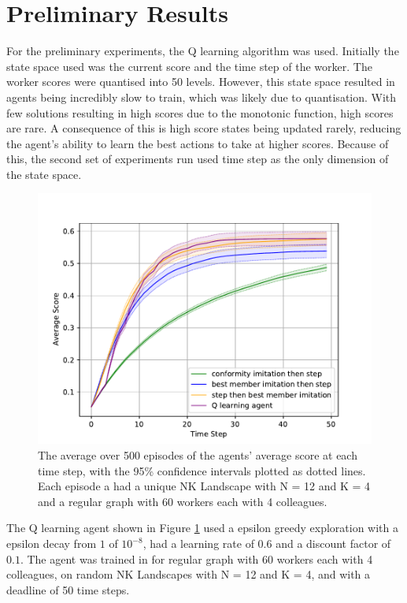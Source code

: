 \documentclass[conference]{IEEEtran}
\begin{document}
\section{Preliminary Results}\label{results}

For the preliminary experiments,
the Q learning algorithm \cite{qlearning} was used.
Initially the state space used was the current score
and the time step of the worker.
The worker scores were quantised into 50 levels.
However, this state space resulted in agents being incredibly slow to train,
which was likely due to quantisation.
With few solutions resulting in high scores due to the monotonic function,
high scores are rare.
A consequence of this is high score states being updated rarely,
reducing the agent's ability to learn the best actions to take at higher scores.
Because of this, the second set of experiments run used time step
as the only dimension of the state space.

\begin{figure}[htbp]
    \centering
    \centerline{\includegraphics[scale=0.58]{figures/version4.pdf}}
    \caption{
        The average over 500 episodes of the agents' average score
        at each time step, with the 95\% confidence intervals
        plotted as dotted lines.
        Each episode a had a unique NK Landscape with N = 12 and K = 4
        and a regular graph with 60 workers each with 4 colleagues.
    }
    \label{avscore}
\end{figure}

The Q learning agent shown in Figure \ref{avscore}
used a epsilon greedy exploration with a epsilon decay from $1$ of $10^{-8}$,
had a learning rate of $0.6$ and a discount factor of $0.1$.
The agent was trained in for regular graph with 60 workers
each with 4 colleagues, on random NK Landscapes with N = 12 and K = 4,
and with a deadline of 50 time steps.
\end{document}
